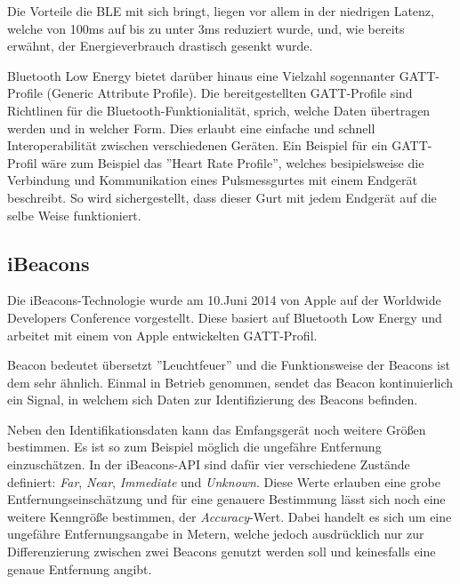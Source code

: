 Die Vorteile die BLE mit sich bringt, liegen vor allem in der niedrigen Latenz, welche von 100ms auf bis zu unter 3ms reduziert wurde, und, wie bereits erwähnt, der Energieverbrauch drastisch gesenkt wurde.



Bluetooth Low Energy bietet darüber hinaus eine Vielzahl sogennanter GATT-Profile (Generic Attribute Profile). Die bereitgestellten GATT-Profile sind Richtlinen für die Bluetooth-Funktionialität, sprich, welche Daten übertragen werden und in welcher Form. Dies erlaubt eine einfache und schnell Interoperabilität zwischen verschiedenen Geräten. Ein Beispiel für ein GATT-Profil wäre zum Beispiel das ''Heart Rate Profile'', welches besipielsweise die Verbindung und Kommunikation eines Pulsmessgurtes mit einem Endgerät beschreibt. So wird sichergestellt, dass dieser Gurt mit jedem Endgerät auf die selbe Weise funktioniert.




\subsection{iBeacons}
\label{sec:technologies:bluetoothLE:ibeacons}
Die iBeacons-Technologie wurde am 10.Juni 2014 von Apple auf der Worldwide Developers Conference vorgestellt. 
Diese basiert auf Bluetooth Low Energy und arbeitet mit einem von Apple entwickelten GATT-Profil.

Beacon bedeutet übersetzt ''Leuchtfeuer'' und die Funktionsweise der Beacons ist dem sehr ähnlich.
Einmal in Betrieb genommen, sendet das Beacon kontinuierlich ein Signal, in welchem sich Daten zur Identifizierung des Beacons befinden.

Neben den Identifikationsdaten kann das Emfangsgerät noch weitere Größen bestimmen. Es ist so zum Beispiel möglich die ungefähre Entfernung einzuschätzen. 
In der iBeacons-API sind dafür vier verschiedene Zustände definiert: \textit{Far}, \textit{Near}, \textit{Immediate} und \textit{Unknown}. Diese Werte erlauben eine grobe Entfernungseinschätzung und für eine genauere Bestimmung lässt sich noch eine weitere Kenngröße bestimmen, der \textit{Accuracy}-Wert. Dabei handelt es sich um eine ungefähre Entfernungsangabe in Metern, welche jedoch ausdrücklich nur zur Differenzierung zwischen zwei Beacons genutzt werden soll und keinesfalls eine genaue Entfernung angibt.


